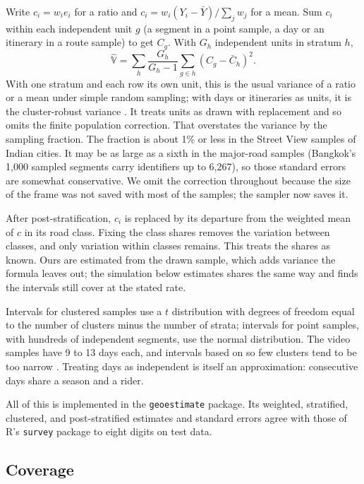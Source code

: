 \documentclass[11pt]{article}
\newcommand{\V}{\mathbb{V}}
\newcommand{\Yba}{\bar{Y}}
\begin{document}
Write $c_i = w_i e_i$ for a ratio and $c_i = w_i (Y_i - \Yba) / \sum_j w_j$ for a mean. Sum $c_i$ within each independent unit $g$ (a segment in a point sample, a day or an itinerary in a route sample) to get $C_g$. With $G_h$ independent units in stratum $h$,
\begin{equation}
    \widehat{\V} = \sum_h \frac{G_h}{G_h - 1} \sum_{g \in h} \left(C_g - \bar{C}_h\right)^2 .
    \label{eq:variance}
\end{equation}
With one stratum and each row its own unit, this is the usual variance of a ratio or a mean under simple random sampling; with days or itineraries as units, it is the cluster-robust variance \citep{cameron2015cluster}. It treats units as drawn with replacement and so omits the finite population correction. That overstates the variance by the sampling fraction. The fraction is about 1\% or less in the Street View samples of Indian cities. It may be as large as a sixth in the major-road samples (Bangkok's 1,000 sampled segments carry identifiers up to 6,267), so those standard errors are somewhat conservative. We omit the correction throughout because the size of the frame was not saved with most of the samples; the sampler now saves it.

After post-stratification, $c_i$ is replaced by its departure from the weighted mean of $c$ in its road class. Fixing the class shares removes the variation between classes, and only variation within classes remains. This treats the shares as known. Ours are estimated from the drawn sample, which adds variance the formula leaves out; the simulation below estimates shares the same way and finds the intervals still cover at the stated rate.

Intervals for clustered samples use a $t$ distribution with degrees of freedom equal to the number of clusters minus the number of strata; intervals for point samples, with hundreds of independent segments, use the normal distribution. The video samples have 9 to 13 days each, and intervals based on so few clusters tend to be too narrow \citep{cameron2015cluster}. Treating days as independent is itself an approximation: consecutive days share a season and a rider.

All of this is implemented in the \texttt{geoestimate} package. Its weighted, stratified, clustered, and post-stratified estimates and standard errors agree with those of R's \texttt{survey} package to eight digits on test data.

\subsection{Coverage}
\end{document}
